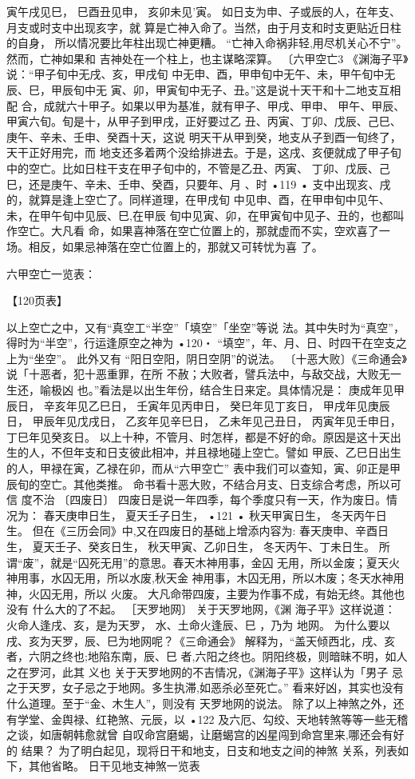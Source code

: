 寅午戌见巳，
巳酉丑见申，
亥卯未见'寅。
如日支为申、子或辰的人，在年支、月支或时支中出现亥字，就
算是亡神入命了。当然，由于月支和时支更贴近日柱的自身，
所以情况要比年柱出现亡神更糟。
“亡神入命祸非轻,用尽机关心不宁”。 然而，亡神如果和
吉神处在一个柱上，也主谋略深算。
〔六甲空亡3 《渊海子平》说：“甲子旬中无戌、亥，甲戌旬
中无申、酉，甲申旬中无午、未，甲午旬中无辰、巳，甲辰旬中无
寅、卯，甲寅旬中无子、丑。”这是说十天干和十二地支互相配
合，成就六十甲子。如果以甲为基准，就有甲子、甲戌、甲申、
甲午、甲辰、甲寅六旬。旬是十，从甲子到甲戌，正好要过乙
丑、丙寅、丁卯、戊辰、己巳、庚午、辛未、壬申、癸酉十天，这说
明天干从甲到癸，地支从子到酉一旬终了，天干正好用完，而
地支还多着两个没给排进去。于是，这戌、亥便就成了甲子旬
中的空亡。比如日柱干支在甲子旬中的，不管是乙丑、丙寅、
丁卯、戊辰、己巳，还是庚午、辛未、壬申、癸酉，只要年、月 、时
•119 •
支中出现亥、戌的，就算是逢上空亡了。同样道理，在甲戌旬
中见申、酉，在甲申旬中见午、未，在甲午旬中见辰、巳,在甲辰
旬中见寅、卯，在甲寅旬中见子、丑的，也都叫作空亡。大凡看
命，如果喜神落在空亡位置上的，那就虚而不实，空欢喜了一
场。相反，如果忌神落在空亡位置上的，那就又可转忧为喜
了。

六甲空亡一览表：

【120页表】

以上空亡之中，又有“真空工“半空”「填空”「坐空”等说
法。其中失时为“真空”，得时为“半空”，行运逢原空之神为
•120・
“填空”，年、月、日、时四干在空支之上为“坐空”。 此外又有
“阳日空阳，阴日空阴”的说法。
〔十恶大败〕《三命通会》说「十恶者，犯十恶重罪，在所
不赦；大败者，譬兵法中，与敌交战，大败无一生还，喻极凶
也。”看法是以出生年份，结合生日来定。具体情况是：
庚成年见甲辰日，
辛亥年见乙巳日，
壬寅年见丙申日，
癸巳年见丁亥日，
甲戌年见庚辰日，
甲辰年见戊戌日，
乙亥年见辛巳日，
乙未年见己丑日，
丙寅年见壬申日，
丁巳年见癸亥日。
以上十种，不管月、时怎样，都是不好的命。原因是这十天出
生的人，不但年支和日支彼此相冲，并且禄地碰上空亡。譬如
甲辰、乙巳日出生的人，甲禄在寅，乙禄在卯，而从“六甲空亡”
表中我们可以查知，寅、卯正是甲辰旬的空亡。其他类推。
命书看十恶大败，不结合月支、日支综合考虑，所以可信
度不治
〔四废日〕
四废日是说一年四季，每个季度只有一天，作为废日。情
况为：
春天庚申日生，
夏天壬子日生，
•121 •
秋天甲寅日生，
冬天丙午日生。
但在《三历会同》中,又在四废日的基础上增添内容为:
春天庚申、辛酉日生，
夏天壬子、癸亥日生，
秋天甲寅、乙卯日生，
冬天丙午、丁未日生。
所谓“废”，就是“囚死无用”的意思。春天木神用事，金囚
无用，所以金废；夏天火神用事，水囚无用，所以水废,秋天金
神用事，木囚无用，所以木废；冬天水神用神，火囚无用，所以
火废。
大凡命带四废，主要为作事不成，有始无终。其他也没有
什么大的了不起。
［天罗地网〕
关于天罗地网，《渊 海子平》这样说道：
火命人逢戌、亥，是为天罗，
水、土命火逢辰、巳 ，乃为 地网。
为什么要以戌、亥为天罗，辰、巳为地网呢？《三命通会》
解释为，“盖天倾西北，戌、亥者，六阴之终也;地陷东南，辰、巳
者,六阳之终也。阴阳终极，则暗昧不明，如人之在罗河，此其
义也
关于天罗地网的不吉情况，《渊海子平》这样认为「男子
忌之于天罗，女子忌之于地网。多生执滞,如恶杀必至死亡。”
看来好凶，其实也没有什么道理。至于“金、木生人”，则没有
天罗地网的说法。
除了以上神煞之外，还有学堂、金舆禄、红艳煞、元辰，以
•122
及六厄、勾绞、天地转煞等等一些无稽之谈，如唐朝韩愈就曾
自叹命宫磨蝎，让磨蝎宫的凶星闯到命宫里来,哪还会有好的
结果？
为了明白起见，现将日干和地支，日支和地支之间的神煞
关系，列表如下，其他省略。
日干见地支神煞一览表

